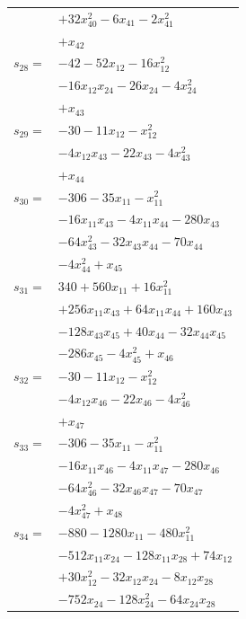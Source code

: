 \begin{longtable}{@{}r@{\;}l@{}}
 & \(\displaystyle +32x_{40}^{2} -6x_{41} -2x_{41}^{2}\) \\
 & \(\displaystyle +x_{42}\) \\[3pt]
\(s_{28}=\) & \(\displaystyle -42 -52x_{12} -16x_{12}^{2}\) \\
 & \(\displaystyle -16x_{12}x_{24} -26x_{24} -4x_{24}^{2}\) \\
 & \(\displaystyle +x_{43}\) \\[3pt]
\(s_{29}=\) & \(\displaystyle -30 -11x_{12} -x_{12}^{2}\) \\
 & \(\displaystyle -4x_{12}x_{43} -22x_{43} -4x_{43}^{2}\) \\
 & \(\displaystyle +x_{44}\) \\[3pt]
\(s_{30}=\) & \(\displaystyle -306 -35x_{11} -x_{11}^{2}\) \\
 & \(\displaystyle -16x_{11}x_{43} -4x_{11}x_{44} -280x_{43}\) \\
 & \(\displaystyle -64x_{43}^{2} -32x_{43}x_{44} -70x_{44}\) \\
 & \(\displaystyle -4x_{44}^{2} +x_{45}\) \\[3pt]
\(s_{31}=\) & \(\displaystyle 340 +560x_{11} +16x_{11}^{2}\) \\
 & \(\displaystyle +256x_{11}x_{43} +64x_{11}x_{44} +160x_{43}\) \\
 & \(\displaystyle -128x_{43}x_{45} +40x_{44} -32x_{44}x_{45}\) \\
 & \(\displaystyle -286x_{45} -4x_{45}^{2} +x_{46}\) \\[3pt]
\(s_{32}=\) & \(\displaystyle -30 -11x_{12} -x_{12}^{2}\) \\
 & \(\displaystyle -4x_{12}x_{46} -22x_{46} -4x_{46}^{2}\) \\
 & \(\displaystyle +x_{47}\) \\[3pt]
\(s_{33}=\) & \(\displaystyle -306 -35x_{11} -x_{11}^{2}\) \\
 & \(\displaystyle -16x_{11}x_{46} -4x_{11}x_{47} -280x_{46}\) \\
 & \(\displaystyle -64x_{46}^{2} -32x_{46}x_{47} -70x_{47}\) \\
 & \(\displaystyle -4x_{47}^{2} +x_{48}\) \\[3pt]
\(s_{34}=\) & \(\displaystyle -880 -1280x_{11} -480x_{11}^{2}\) \\
 & \(\displaystyle -512x_{11}x_{24} -128x_{11}x_{28} +74x_{12}\) \\
 & \(\displaystyle +30x_{12}^{2} -32x_{12}x_{24} -8x_{12}x_{28}\) \\
 & \(\displaystyle -752x_{24} -128x_{24}^{2} -64x_{24}x_{28}\) \\

\end{longtable}
